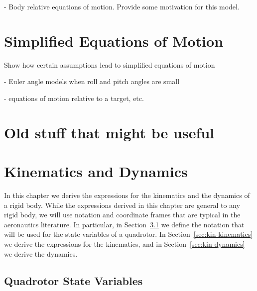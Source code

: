 {- Body relative equations of motion.  Provide some motivation for this model.

\section{Simplified Equations of Motion}

Show how certain assumptions lead to simplified equations of motion

- Euler angle models when roll and pitch angles are small

- equations of motion relative to a target, etc.


\section{Old stuff that might be useful}


\section{Kinematics and Dynamics} \label{chap:kinematics}

In this chapter we derive the expressions for the kinematics and the
dynamics of a rigid body.  While the expressions derived in this
chapter are general to any rigid body, we will use notation and
coordinate frames that are typical in the aeronautics literature. In
particular, in Section~\ref{sec:kin-state-variables} we define the
notation that will be used for the state variables of a quadrotor.
In Section~\ref{sec:kin-kinematics} we derive the expressions for
the kinematics, and in Section~\ref{sec:kin-dynamics} we derive the
dynamics.



\subsection{Quadrotor State Variables} %
\label{sec:kin-state-variables}

}
